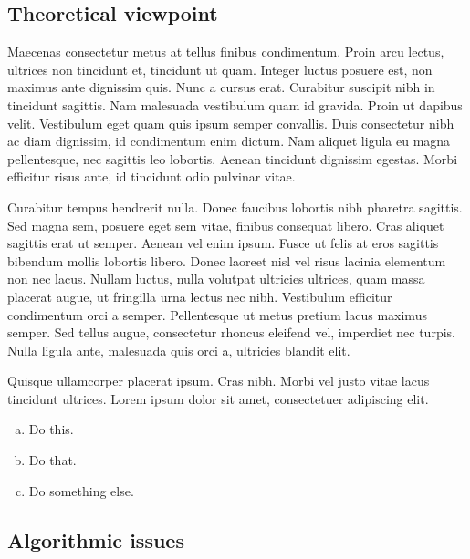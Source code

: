 \documentclass{article}
\begin{document}

\subsection{Theoretical viewpoint}

Maecenas consectetur metus at tellus finibus condimentum. Proin arcu lectus, ultrices non tincidunt et, tincidunt ut quam. Integer luctus posuere est, non maximus ante dignissim quis. Nunc a cursus erat. Curabitur suscipit nibh in tincidunt sagittis. Nam malesuada vestibulum quam id gravida. Proin ut dapibus velit. Vestibulum eget quam quis ipsum semper convallis. Duis consectetur nibh ac diam dignissim, id condimentum enim dictum. Nam aliquet ligula eu magna pellentesque, nec sagittis leo lobortis. Aenean tincidunt dignissim egestas. Morbi efficitur risus ante, id tincidunt odio pulvinar vitae.

Curabitur tempus hendrerit nulla. Donec faucibus lobortis nibh pharetra sagittis. Sed magna sem, posuere eget sem vitae, finibus consequat libero. Cras aliquet sagittis erat ut semper. Aenean vel enim ipsum. Fusce ut felis at eros sagittis bibendum mollis lobortis libero. Donec laoreet nisl vel risus lacinia elementum non nec lacus. Nullam luctus, nulla volutpat ultricies ultrices, quam massa placerat augue, ut fringilla urna lectus nec nibh. Vestibulum efficitur condimentum orci a semper. Pellentesque ut metus pretium lacus maximus semper. Sed tellus augue, consectetur rhoncus eleifend vel, imperdiet nec turpis. Nulla ligula ante, malesuada quis orci a, ultricies blandit elit.

\begin{question}
	Quisque ullamcorper placerat ipsum. Cras nibh. Morbi vel justo vitae lacus tincidunt ultrices. Lorem ipsum dolor sit amet, consectetuer adipiscing elit.

	\begin{enumerate}[(a)]
		\item Do this.
		\item Do that.
		\item Do something else.
	\end{enumerate}
\end{question}
	

\subsection{Algorithmic issues}
\end{document}
